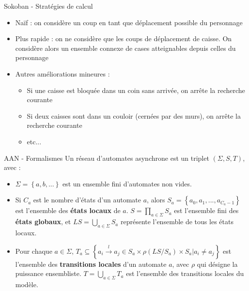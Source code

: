 \documentclass{beamer}
\begin{document}
\begin{frame}{Sokoban - Stratégies de calcul}
	\begin{itemize}
		\item Naïf : on considère un coup en tant que déplacement possible du personnage
		\pause
		\item Plus rapide : on ne considère que les coups de déplacement de caisse. On considère alors un ensemble connexe de cases atteignables depuis celles du personnage
		\pause
		\item Autres améliorations mineures :
		\begin{itemize}
			\item Si une caisse est bloquée dans un coin sans arrivée, on arrête la recherche courante
			\item Si deux caisses sont dans un couloir (cernées par des murs), on arrête la recherche courante
			\item etc...
		\end{itemize}
	\end{itemize}
\end{frame}

\begin{frame}{AAN - Formalismes}
	Un réseau d'automates asynchrone est un triplet $(\Sigma,S,T)$, avec :
	\begin{itemize}
		\pause
		\item $\Sigma=\left\{a,b,...\right\}$ est un ensemble fini d'automates non vides.
		\pause
		\item Si $C_a$ est le nombre d'états d'un automate $a$, alors $S_a=\left\{a_0,a_1,...,a_{C_a-1}\right\}$ est l'ensemble des \textbf{états locaux} de $a$. $S=\displaystyle{\prod_{a\in\Sigma}}S_a$ est 
		l'ensemble fini des \textbf{états globaux}, et $LS=\displaystyle{\bigcup_{a\in\Sigma}}S_a$ représente l'ensemble de tous les états locaux.
		\pause
		\item Pour chaque $a\in\Sigma$, $T_a\subseteq\left\{a_i\xrightarrow{l}a_j\in S_a\times\rho(LS/S_a)\times S_a|a_i\neq a_j\right\}$ est l'ensemble des \textbf{transitions locales} d'un automate $a$, avec 
		$\rho$ qui désigne la puissance ensembliste. $T=\displaystyle{\bigcup_{a\in\Sigma}}T_a$ est l'ensemble des transitions locales du modèle.
	\end{itemize}
\end{frame}
\end{document}
